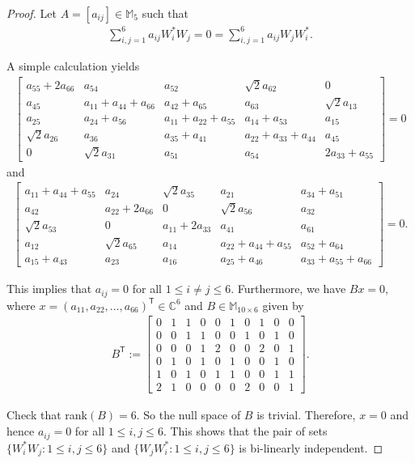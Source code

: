 \documentclass[10pt,reqno]{amsart}
\theoremstyle{definition}
\theoremstyle{plain}
\theoremstyle{remark}
\renewcommand{\sf}[1]{\textsf{#1}}
\newcommand{\mbb}[1]{\mathbb{#1}}
\newcommand{\msc}[1]{\mathscr{#1}}
\newcommand{\M}[1]{\mbb{M}_{#1}}%
\newcommand{\Matrix}[1]{\begin{bmatrix}#1\end{bmatrix}}
\DeclareMathOperator{\T}{\sf{T}}
\numberwithin{equation}{section}%
\begin{document}
\begin{proof}
	Let $A=[a_{ij}]\in\M{5}$ such that
	\begin{align*}
		\sum_{i,j=1}^6a_{ij}W_i^*W_j=0=\sum_{i,j=1}^6a_{ij}W_jW_i^*.
	\end{align*}
	
	
	A simple calculation yields
    \small
	\begin{align*}
		\Matrix{a_{55}+2a_{66}&a_{54}&a_{52}&\sqrt{2}a_{62}&0\\
			a_{45}&a_{11}+a_{44}+a_{66}&a_{42}+a_{65}&a_{63}&\sqrt{2}a_{13}\\
			a_{25}&a_{24}+a_{56}&a_{11}+a_{22}+a_{55}&a_{14}+a_{53}&a_{15}\\
			\sqrt{2}a_{26}&a_{36}&a_{35}+a_{41}&a_{22}+a_{33}+a_{44}&a_{45}\\
			0&\sqrt{2}a_{31}&a_{51}&a_{54}&2a_{33}+a_{55}}=0
	\end{align*}
    \normalsize
	and 
    \small
	\begin{align*}
		\Matrix{a_{11}+a_{44}+a_{55}&a_{24}&\sqrt{2}a_{35}&a_{21}&a_{34}+a_{51}\\
			a_{42}&a_{22}+2a_{66}&0&\sqrt{2}a_{56}&a_{32}\\
			\sqrt{2}a_{53}&0&a_{11}+2a_{33}&a_{41}&a_{61}\\
			a_{12}&\sqrt{2}a_{65}&a_{14}&a_{22}+a_{44}+a_{55}&a_{52}+a_{64}\\
			a_{15}+a_{43}&a_{23}&a_{16}&a_{25}+a_{46}&a_{33}+a_{55}+a_{66}}=0.
	\end{align*}
    \normalsize
	
	
	This implies that $a_{ij}=0$ for all $1\leq i\neq j\leq 6$. Furthermore, we have $Bx=0$, where $x=(a_{11},a_{22},\hdots, a_{66})^{\T}\in\mbb{C}^6$ and $B\in\M{10\times 6}$ given by
    \small
	\begin{align*}
		B^{\T}:=\Matrix{0&1&1&0&0&1&0&1&0&0\\0&0&1&1&0&0&1&0&1&0\\0&0&0&1&2&0&0&2&0&1\\0&1&0&1&0&1&0&0&1&0\\1&0&1&0&1&1&0&0&1&1\\2&1&0&0&0&0&2&0&0&1}.
	\end{align*}
    \normalsize
    
    Check that rank$(B)=6$. So the null space of $B$ is trivial. Therefore, $x=0$ and hence $a_{ij}=0$ for all $1\leq i,j\leq 6$. This shows that the pair of sets $\{W_i^*W_j:1\leq i,j\leq 6\}$ and $\{W_jW_i^*:1\leq i,j\leq 6\}$ is bi-linearly independent.
\end{proof}
\end{document}
